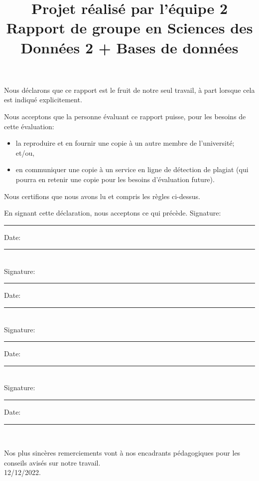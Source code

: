 \documentclass[mstat,12pt]{unswthesis}
\title{Projet réalisé par l'équipe 2\\[0.5cm]Rapport de groupe en
Sciences des Données 2 + Bases de données}
\author{\Authornameonly}
\begin{document}
\beforepreface




\vskip 2pc \noindent Nous déclarons que ce rapport est le fruit de notre seul travail, à part lorsque cela est indiqué  explicitement. 

\vskip 2pc  \noindent Nous acceptons que la personne évaluant ce rapport puisse, pour les besoins de cette évaluation:
\begin{itemize}
\item la reproduire et en fournir une copie à un autre membre de l'université; et/ou,
\item en communiquer une copie à un service en ligne de détection de plagiat (qui pourra en retenir une copie pour les besoins d'évaluation future).
\end{itemize}

\vskip 2pc \noindent Nous certifions que nous avons lu et compris les règles ci-dessus.\vspace{24pt}

\vskip 2pc \noindent En signant cette déclaration, nous acceptons ce qui précède.
\vskip 2pc \noindent
Signature: \rule{7cm}{0.25pt} \hfill Date: \rule{4cm}{0.25pt} \\[1cm]
Signature: \rule{7cm}{0.25pt} \hfill Date: \rule{4cm}{0.25pt} \\[1cm]
Signature: \rule{7cm}{0.25pt} \hfill Date: \rule{4cm}{0.25pt} \\[1cm]
Signature: \rule{7cm}{0.25pt} \hfill Date: \rule{4cm}{0.25pt} \\[1cm]
\vskip 1pc





{\bigskip}Nos plus sincères remerciements vont à nos encadrants
pédagogiques pour les conseils avisés sur notre travail.\\[1cm] 

{\bigskip\bigskip\bigskip\noindent} 12/12/2022.








\afterpreface
\end{document}
